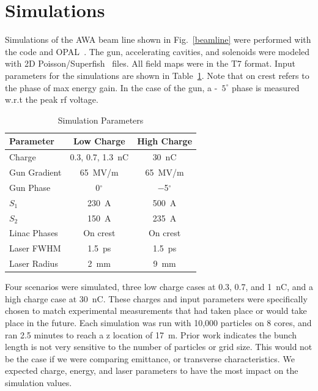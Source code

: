 \documentclass[letterpaper,  %
              ]{jacow-2_3}   %
\begin{document}
\section{Simulations}
Simulations of the AWA beam line shown in Fig.~\ref{beamline}
were performed with the code and OPAL~\cite{opal}.
The gun, accelerating cavities, and solenoids were modeled with 2D
Poisson/Superfish~\cite{fish} files. All field maps were in the T7 format.
Input parameters for the simulations are shown in Table~\ref{simparam}.
Note that on crest refers to the phase of max energy gain.
In the case of the gun, a -~$5^{\circ}$ phase is measured 
w.r.t the peak rf voltage.
\begin{table}[hbt]
	\centering
	\caption{Simulation Parameters}
	\begin{tabular}{lcc}
		\toprule
		\textbf{Parameter} & \textbf{Low Charge}  & \textbf{High Charge} \\
		\midrule
		Charge       & 0.3, 0.7, \SI{1.3}{nC}        & \SI{30}{nC}    \\ %
		Gun Gradient & \SI{65}{MV/m}     & \SI{65}{MV/m}  \\ %
		Gun Phase    & \SI{0}{}$^{\circ}$ & \SI{-5}{}$^{\circ}$ \\		 
		$S_1$        & \SI{230}{A}		 & \SI{500}{A}	  \\
		$S_2$		 & \SI{150}{A}   	 & \SI{235}{A}		 \\
		Linac Phases & On crest          & On crest       \\
		Laser FWHM   & \SI{1.5}{ps}      & \SI{1.5}{ps}   \\ %
		Laser Radius & \SI{2}{mm}        & \SI{9}{mm}     \\
		\bottomrule
	\end{tabular}
	\label{simparam}
\end{table}

Four scenarios were simulated, three low charge cases at 0.3, 0.7, and \SI{1}{nC}, and a 
high charge case at \SI{30}{nC}. 
These charges and input parameters were specifically chosen to 
match experimental measurements that had taken place or would 
take place in the future. Each simulation was run with 10,000 particles 
on 8 cores, and ran 2.5 minutes to reach a z location of \SI{17}{m}.
Prior work \cite{benchmark} indicates the bunch length is not 
very sensitive to the number of particles or grid size. 
This would not be the case if we were comparing emittance, or 
transverse characteristics. We expected charge, energy,
and laser parameters to have the most impact on the simulation values.
\end{document}
